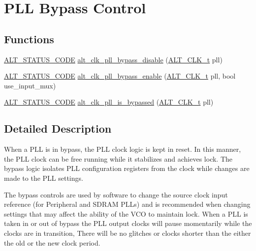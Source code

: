 \hypertarget{group__CLK__MGR__BYPASS}{}\section{P\+LL Bypass Control}
\label{group__CLK__MGR__BYPASS}
\subsection*{Functions}
\begin{DoxyCompactItemize}
\item 
\mbox{\hyperlink{hwlib_8h_abdb0d369f069723ca55d6c94bcaaaa12}{A\+L\+T\+\_\+\+S\+T\+A\+T\+U\+S\+\_\+\+C\+O\+DE}} \mbox{\hyperlink{group__CLK__MGR__BYPASS_gabf3771138273ff77637fd6ad758347c0}{alt\+\_\+clk\+\_\+pll\+\_\+bypass\+\_\+disable}} (\mbox{\hyperlink{group__CLK__MGR_ga4cdb80e84284365fe3d47c2f8050b13d}{A\+L\+T\+\_\+\+C\+L\+K\+\_\+t}} pll)
\item 
\mbox{\hyperlink{hwlib_8h_abdb0d369f069723ca55d6c94bcaaaa12}{A\+L\+T\+\_\+\+S\+T\+A\+T\+U\+S\+\_\+\+C\+O\+DE}} \mbox{\hyperlink{group__CLK__MGR__BYPASS_gaaca34e9742b2602995e6fe2f58a6d68a}{alt\+\_\+clk\+\_\+pll\+\_\+bypass\+\_\+enable}} (\mbox{\hyperlink{group__CLK__MGR_ga4cdb80e84284365fe3d47c2f8050b13d}{A\+L\+T\+\_\+\+C\+L\+K\+\_\+t}} pll, bool use\+\_\+input\+\_\+mux)
\item 
\mbox{\hyperlink{hwlib_8h_abdb0d369f069723ca55d6c94bcaaaa12}{A\+L\+T\+\_\+\+S\+T\+A\+T\+U\+S\+\_\+\+C\+O\+DE}} \mbox{\hyperlink{group__CLK__MGR__BYPASS_ga4c3a63abaf39a4cb0ea0f89ed9754e28}{alt\+\_\+clk\+\_\+pll\+\_\+is\+\_\+bypassed}} (\mbox{\hyperlink{group__CLK__MGR_ga4cdb80e84284365fe3d47c2f8050b13d}{A\+L\+T\+\_\+\+C\+L\+K\+\_\+t}} pll)
\end{DoxyCompactItemize}


\subsection{Detailed Description}
When a P\+LL is in bypass, the P\+LL clock logic is kept in reset. In this manner, the P\+LL clock can be free running while it stabilizes and achieves lock. The bypass logic isolates P\+LL configuration registers from the clock while changes are made to the P\+LL settings.

The bypass controls are used by software to change the source clock input reference (for Peripheral and S\+D\+R\+AM P\+L\+Ls) and is recommended when changing settings that may affect the ability of the V\+CO to maintain lock. When a P\+LL is taken in or out of bypass the P\+LL output clocks will pause momentarily while the clocks are in transition, There will be no glitches or clocks shorter than the either the old or the new clock period.

